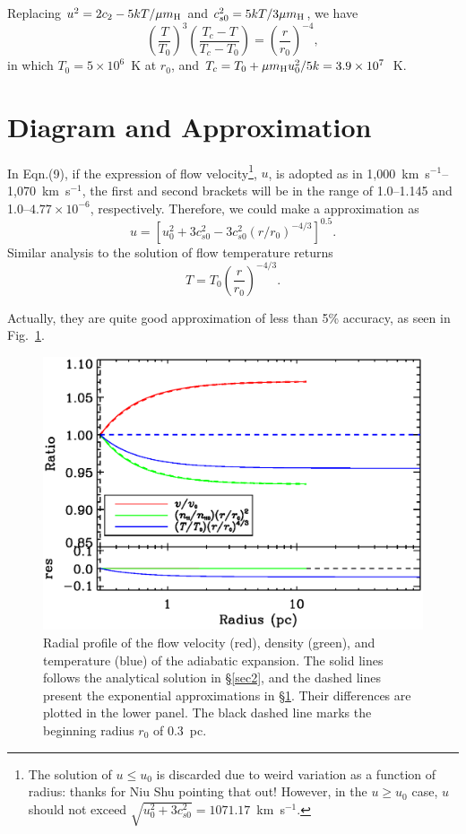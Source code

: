 \documentclass[preprint,12pt,longnamesfirst]{aastex}
\newcommand {\kms}{km~s$^{-1}$}
\begin{document}
Replacing $u^2=2c_2-5kT/\mu{}m_{\rm H}$ and $c^2_{s0}=5kT/3\mu{}m_{\rm H}$,
we have
\begin{equation}
  \left(\frac{T}{T_0}\right)^3\left(\frac{T_c-T}{T_c-T_0}\right)
  = \left(\frac{r}{r_0}\right)^{-4},
\end{equation}
in which $T_0=5\times10^6$~K at $r_0$, and
$T_c=T_0+\mu{}m_{\rm H}u^2_0/5k=3.9\times10^7$~K.


\section{Diagram and Approximation}\label{sec3}

In Eqn.(9), if the expression of flow velocity\footnote{The solution
of $u\leq{}u_0$ is discarded due to weird variation as a function of
radius: thanks for Niu Shu pointing that out! However, in the
$u\geq{}u_0$ case, $u$ should not exceed
$\sqrt{u^2_0+3c^2_{s0}}=1071.17$~\kms.}, $u$, is adopted as in
1,000~\kms--1,070~\kms, the first and second brackets will be in
the range of 1.0--1.145 and 1.0--$4.77\times10^{-6}$,
respectively. Therefore, we could make a approximation as
\begin{equation}
  u=\left[u^2_0+3c^2_{s0}-3c^2_{s0}\left(r/r_0\right)^{-4/3}\right]^{0.5}.
\end{equation}
Similar analysis to the solution of flow temperature returns
\begin{equation}
  T=T_0\left(\frac{r}{r_0}\right)^{-4/3}.
\end{equation}

Actually, they are quite good approximation of less than 5\% accuracy,
as seen in Fig.~\ref{fig1}.

\begin{figure}
  \centering
  \includegraphics{figures/adia.exp_phy.eps}
  \caption{Radial profile of the flow velocity (red), density (green),
  and temperature (blue) of the adiabatic expansion. The solid lines
  follows the analytical solution in \S\ref{sec2}, and the dashed lines
  present the exponential approximations in \S\ref{sec3}. Their
  differences are plotted in the lower panel. The black
  dashed line marks the beginning radius $r_0$ of 0.3~pc.\label{fig1}}
\end{figure}
\end{document}
